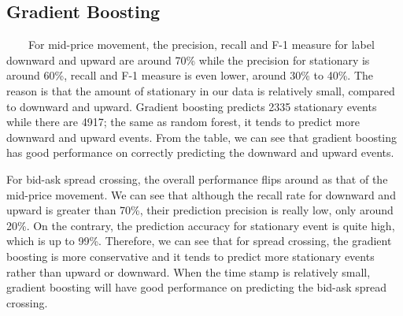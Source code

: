 \documentclass[11pt]{article}
\begin{document}
  \begin{table} [!htb]
    \small
\caption{Random Forest: Bid-Ask Spread Crossing Confusion Matrix}
\centering
{}
  \end{table}
  \begin{table} [!htb]
    \small
\caption{Random Forest: Bid-Ask Spread Crossing Measures}
\centering
{}
  \end{table}
  
\subsection{Gradient Boosting}
\ \ \ \ For mid-price movement, the precision, recall and F-1 measure for label downward and upward are around 70\% while the precision for stationary is around 60\%, recall and F-1 measure is even lower, around 30\% to 40\%. The reason is that the amount of stationary in our data is relatively small, compared to downward and upward. Gradient boosting predicts 2335 stationary events while there are 4917; the same as random forest, it tends to predict more downward and upward events. From the table, we can see that gradient boosting has good performance on correctly predicting the downward and upward events.
\par 
For bid-ask spread crossing, the overall performance flips around as that of the mid-price movement. We can see that although the recall rate for downward and upward is greater than 70\%, their prediction precision is really low, only around 20\%. On the contrary, the prediction accuracy for stationary event is quite high, which is up to 99\%. Therefore, we can see that for spread crossing, the gradient boosting is more conservative and it tends to predict more stationary events rather than upward or downward. When the time stamp is relatively small, gradient boosting will have good performance on predicting the bid-ask spread crossing.
\end{document}
